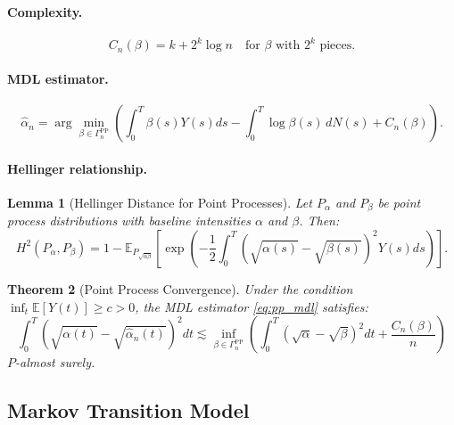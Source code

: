 \documentclass[preprint,review,12pt]{article}
\newtheorem{theorem}{Theorem}[section]
\newtheorem{lemma}[theorem]{Lemma}
\begin{document}
\paragraph{Complexity.}
\begin{equation}\label{eq:pp_complexity}
C_n(\beta) = k + 2^k \log n \quad \text{for } \beta \text{ with } 2^k \text{ pieces}.
\end{equation}

\paragraph{MDL estimator.}
\begin{equation}\label{eq:pp_mdl}
\hat{\alpha}_n = \arg\min_{\beta \in \Gamma_n^{\text{PP}}} \left( 
\int_0^T \beta(s) Y(s) ds - \int_0^T \log \beta(s) \, dN(s) + C_n(\beta) \right).
\end{equation}

\paragraph{Hellinger relationship.}

\begin{lemma}[Hellinger Distance for Point Processes]\label{lem:pp_hellinger}
Let $P_\alpha$ and $P_\beta$ be point process distributions with baseline 
intensities $\alpha$ and $\beta$. Then:
\begin{equation}\label{eq:pp_hellinger}
	H^2(P_\alpha, P_\beta) = 1 - \mathbb{E}_{P_{\sqrt{\alpha\beta}}}\left[ 
	\exp\left( -\frac{1}{2} \int_0^T (\sqrt{\alpha(s)} - \sqrt{\beta(s)})^2 Y(s) ds 
	\right) \right].
\end{equation}
\end{lemma}

\begin{theorem}[Point Process Convergence]\label{thm:pp}
Under the condition $\inf_{t} \mathbb{E}[Y(t)] \geq c > 0$, the MDL estimator 
\eqref{eq:pp_mdl} satisfies:
\begin{equation}\label{eq:pp_rate}
	\int_0^T (\sqrt{\alpha(t)} - \sqrt{\hat{\alpha}_n(t)})^2 dt 
	\lesssim \inf_{\beta \in \Gamma_n^{\text{PP}}} \left( 
	\int_0^T (\sqrt{\alpha} - \sqrt{\beta})^2 dt + \frac{C_n(\beta)}{n} \right)
\end{equation}
$P$-almost surely.
\end{theorem}

\subsection{Markov Transition Model}
\label{subsec:markov}
\end{document}
